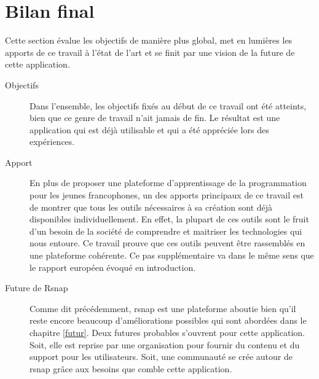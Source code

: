 \section{Bilan final}
Cette section évalue les objectifs de manière plus global, met en lumières les apports de ce travail à l'état de l'art et se finit par une vision de la future de cette application.

\begin{description}
  \item[Objectifs] Dans l'ensemble, les objectifs fixés au début de ce travail ont été atteints, bien que ce genre de travail n'ait jamais de fin. Le résultat est une application qui est déjà utilisable et qui a été appréciée lors des expériences.

  \item[Apport] En plus de proposer une plateforme d'apprentissage de la programmation pour les jeunes francophones, un des apports principaux de ce travail est de montrer que tous les outils nécessaires à sa création sont déjà disponibles individuellement. En effet, la plupart de ces outils sont le fruit d'un besoin de la société de comprendre et maitriser les technologies qui nous entoure. Ce travail prouve que ces outils peuvent être rassemblés en une plateforme cohérente. Ce pas supplémentaire va dans le même sens que le rapport européen \cite{rapport-europeen} évoqué en introduction.

  \item[Future de Rsnap] Comme dit précédemment, \gls{rsnap} est une plateforme aboutie bien qu'il reste encore beaucoup d'améliorations possibles qui sont abordées dans le chapitre \ref{futur}. Deux futures probables s'ouvrent pour cette application. Soit, elle est reprise par une organisation pour fournir du contenu et du support pour les utilisateurs. Soit, une communauté se crée autour de \gls{rsnap} grâce aux besoins que comble cette application.

\end{description}